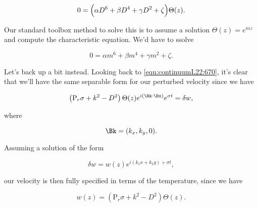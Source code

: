 \begin{equation}\label{eqn:continuumL22:890}
0 = \Bigl( \alpha D^6 + \beta D^4 + \gamma D^2 + \zeta \Bigr) \Theta(z).
\end{equation}

Our standard toolbox method to solve this is to assume a solution $\Theta(z) = e^{m z}$ and compute the characteristic equation.  We'd have to ssolve

\begin{equation}\label{eqn:continuumL22:910}
0 = \alpha m^6 + \beta m^4 + \gamma m^2 + \zeta.
\end{equation}

Let's back up a bit instead.  Looking back to \ref{eqn:continuumL22:670}, it's clear that we'll have the same separable form for our perturbed velocity since we have

\begin{equation}\label{eqn:continuumL22:670}
\left( \text{P}_r \sigma + k^2 - D^2 \right) \Theta(z) e^{i (\Bk \cdot \Bx) } e^{\sigma t} = \delta w,
\end{equation}

where

\begin{equation}\label{eqn:continuumL22:930}
\Bk = (k_x, k_y, 0).
\end{equation}

Assuming a solution of the form

\begin{equation}\label{eqn:continuumL22:950}
\delta w = w(z) e^{ i ( k_1 x + k_2 y) + \sigma t},
\end{equation}

our velocity is then fully specified in terms of the temperature, since we have

\begin{equation}\label{eqn:continuumL22:970}
w(z) = \left( \text{P}_r \sigma + k^2 - D^2 \right) \Theta(z).
\end{equation}

%
%
%
%
%
%
%
%
%
%

